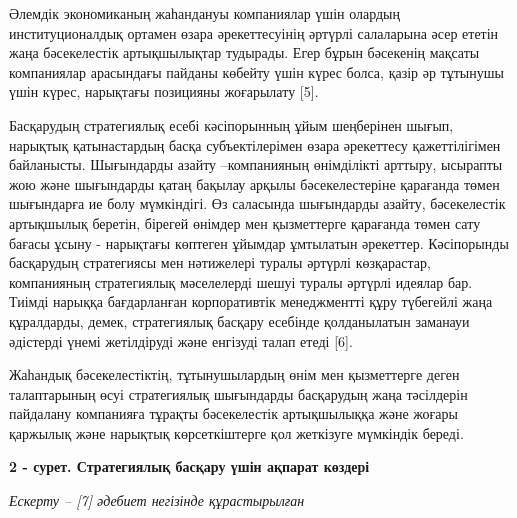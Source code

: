\begin{multicols}{2}
Әлемдік экономиканың жаһандануы компаниялар үшін олардың
институционалдық ортамен өзара әрекеттесуінің әртүрлі салаларына әсер
ететін жаңа бәсекелестік артықшылықтар тудырады. Егер бұрын бәсекенің
мақсаты компаниялар арасындағы пайданы көбейту үшін күрес болса, қазір
әр тұтынушы үшін күрес, нарықтағы позицияны жоғарылату {[}5{]}.

Басқарудың стратегиялық есебі кәсіпорынның ұйым шеңберінен шығып,
нарықтық қатынастардың басқа субъектілерімен өзара әрекеттесу
қажеттілігімен байланысты. Шығындарды азайту --компанияның өнімділікті
арттыру, ысырапты жою және шығындарды қатаң бақылау арқылы
бәсекелестеріне қарағанда төмен шығындарға ие болу мүмкіндігі. Өз
саласында шығындарды азайту, бәсекелестік артықшылық беретін, бірегей
өнімдер мен қызметтерге қарағанда төмен сату бағасы ұсыну - нарықтағы
көптеген ұйымдар ұмтылатын әрекеттер. Кәсіпорынды басқарудың стратегиясы
мен нәтижелері туралы әртүрлі көзқарастар, компанияның стратегиялық
мәселелерді шешуі туралы әртүрлі идеялар бар. Тиімді нарыққа
бағдарланған корпоративтік менеджментті құру түбегейлі жаңа құралдарды,
демек, стратегиялық басқару есебінде қолданылатын заманауи әдістерді
үнемі жетілдіруді және енгізуді талап етеді {[}6{]}.

Жаһандық бәсекелестіктің, тұтынушылардың өнім мен қызметтерге деген
талаптарының өсуі стратегиялық шығындарды басқарудың жаңа тәсілдерін
пайдалану компанияға тұрақты бәсекелестік артықшылыққа және жоғары
қаржылық және нарықтық көрсеткіштерге қол жеткізуге мүмкіндік береді.
\end{multicols}

{\bfseries 2 - сурет. Стратегиялық басқару үшін ақпарат көздері}

\emph{Ескерту -- {[}7{]} әдебиет негізінде құрастырылған}

